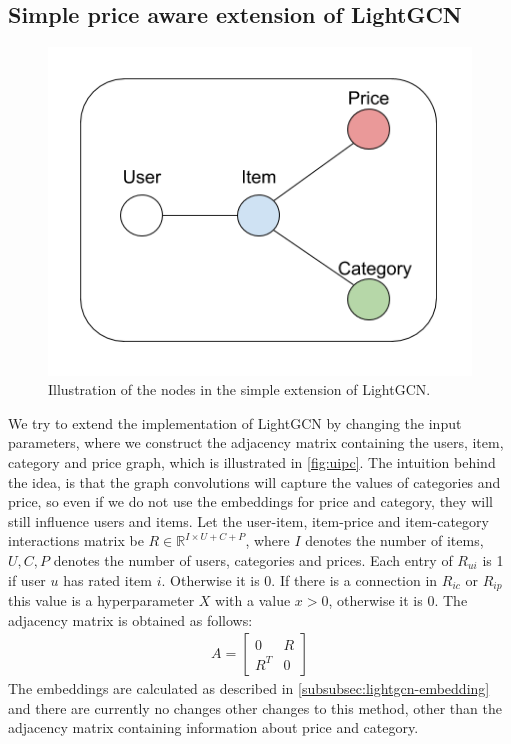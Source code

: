 \subsection{Simple price aware extension of LightGCN}\label{subsec:simple-extension}
\begin{figure}
    \centering
    \includegraphics[scale=0.5]{figures/uipc.png}
    \caption{Illustration of the nodes in the simple extension of LightGCN.}
    \label{fig:uipc}
\end{figure}
We try to extend the implementation of LightGCN by changing the input parameters, where we construct the adjacency matrix containing the users, item, category and price graph, which is illustrated in \autoref{fig:uipc}.
The intuition behind the idea, is that the graph convolutions will capture the values of categories and price, so even if we do not use the embeddings for price and category, they will still influence users and items.
Let the user-item, item-price and item-category interactions matrix be $R \in \mathbb{R}^{I \times U + C + P}$, where $I$ denotes the number of items, $U, C, P$ denotes the number of users, categories and prices.
Each entry of $R_{ui}$ is 1 if user $u$ has rated item $i$. Otherwise it is 0.
If there is a connection in $R_{ic}$ or $R_{ip}$ this value is a hyperparameter $X$ with a value $x>0$, otherwise it is 0.
The adjacency matrix is obtained as follows:
\begin{gather}
    A =
    \begin{bmatrix}
        0   & R \\
        R^T & 0
    \end{bmatrix}
\end{gather}
The embeddings are calculated as described in \autoref{subsubsec:lightgcn-embedding} and there are currently no changes other changes to this method, other than the adjacency matrix containing information about price and category.